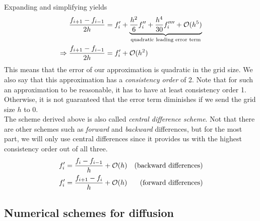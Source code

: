 Expanding and simplifying yields
\begin{align}
        \frac{f_{i+1} - f_{i-1}}{2h} &= f_i' + \underbrace{\frac{h^2}{6}f_i'' + \frac{h^4}{30}f_i'''' +
        \mathcal{O}(h^5)}_\text{quadratic leading error term}\notag\\
            \Rightarrow \frac{f_{i+1} - f_{i-1}}{2h} &= f_i' + \mathcal{O}(h^2)
\end{align}
This means that the error of our approximation is quadratic in the grid size. 
We also say that this approximation has a \textit{consistency order} of 2. Note that for such an
approximation to be reasonable, it has to have at least consistency order 1. Otherwise, it is
not guaranteed that the error term diminishes if we send the grid size $h$ to 0.\\
The scheme derived above is also called \textit{central difference scheme}. Not that there are
other schemes such as \textit{forward} and \textit{backward} differences, but for the most part, we
will only use central differences since it provides us with the highest consistency
order out of all three. 
\begin{align}
    f_i' &= \frac{f_i - f_{i-1}}{h} + \mathcal{O}(h)&\textnormal{(backward differences)}\notag\\
    f_i' &= \frac{f_{i+1} - f_i}{h} + \mathcal{O}(h)&\textnormal{(forward differences)}\notag
\end{align}
\subsection{Numerical schemes for diffusion}
